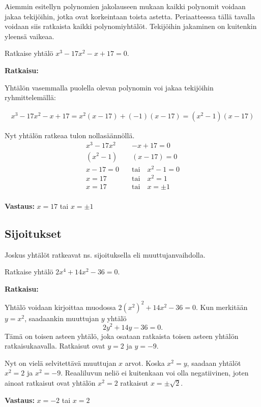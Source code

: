 Aiemmin esitellyn polynomien jakolauseen mukaan kaikki polynomit voidaan jakaa tekijöihin, jotka ovat korkeintaan toista astetta.
Periaatteessa tällä tavalla voidaan siis ratkaista kaikki polynomiyhtälöt. Tekijöihin jakaminen on kuitenkin yleensä vaikeaa.

\begin{esimerkki}
Ratkaise yhtälö $x^3-17x^2-x+17 = 0$.

\textbf{Ratkaisu:}

Yhtälön vasemmalla puolella olevan polynomin voi jakaa tekijöihin ryhmittelemällä:

\begin{align*}
x^3-17x^2-x+17=x^2(x-17)+(-1)(x-17)=(x^2-1)(x-17)
\end{align*}

Nyt yhtälön ratkeaa tulon nollasäännöllä.
\begin{align*}
x^3-17x^2&-x+17=0 \\
(x^2-1)&(x-17)=0 \\
x - 17 = 0 \quad &\text{tai} \quad x^2-1 = 0 \\
x = 17 \quad &\text{tai} \quad x^2 = 1 \\
x = 17 \quad &\text{tai} \quad x =\pm 1 \\
\end{align*}

\textbf{Vastaus:} $x = 17$ tai $x = \pm 1$
\end{esimerkki}

\subsection*{Sijoitukset}
Joskus yhtälöt ratkeavat ns. sijoituksella eli muuttujanvaihdolla.


\begin{esimerkki}
Ratkaise yhtälö $2x^4+14x^2-36=0$.

\textbf{Ratkaisu:}

Yhtälö voidaan kirjoittaa muodossa $2(x^2)^2+14x^2-36=0$. Kun merkitään $y=x^2$, saadaankin muuttujan $y$ yhtälö
\[2y^2+14y-36=0.\]
Tämä on toisen asteen yhtälö, joka osataan ratkaista toisen asteen yhtälön ratkaisukaavalla. Ratkaisut ovat $y = 2$ ja $y = -9$.

Nyt on vielä selvitettävä muuttujan $x$ arvot. Koska $x^2=y$, saadaan yhtälöt $x^2=2$ ja $x^2=-9$. Reaaliluvun neliö ei kuitenkaan voi olla negatiivinen, joten ainoat ratkaisut ovat yhtälön $x^2 = 2$ ratkaisut $x = \pm\sqrt{2}$.

\textbf{Vastaus:} $x=-2$ tai $x=2$
\end{esimerkki}

